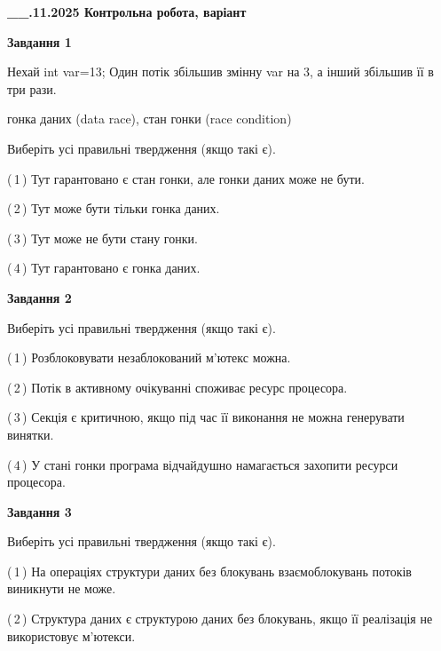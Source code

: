 \documentclass[12pt, ukrainian]{article}
\begin{document}
\begin {large}

\textbf{\_\_.11.2025 Контрольна робота, варіант  }\par


{

\begin{center}
\textbf{Завдання 1}
\end{center}
Нехай int var=13; Один потік збільшив змінну var на 3, а інший збільшив її в три рази.

гонка даних (data race), стан гонки (race condition)

Виберіть усі правильні твердження (якщо такі є).\par
\vspace{2mm}
(\,1\,) Тут гарантовано є стан гонки, але гонки даних може не бути.%

(\,2\,) Тут може бути тільки гонка даних.%

(\,3\,) Тут може не бути стану гонки.%

(\,4\,) Тут гарантовано є гонка даних.%



\begin{center}
\textbf{Завдання 2}
\end{center}
Виберіть усі правильні твердження (якщо такі є).\par
\vspace{2mm}

(\,1\,) Розблоковувати незаблокований м’ютекс можна.%

(\,2\,) Потік в активному очікуванні споживає ресурс процесора.%

(\,3\,) Секція є критичною, якщо під час її виконання не можна генерувати винятки.%

(\,4\,) У стані гонки програма відчайдушно намагається захопити ресурси процесора.%



\begin{center}
\textbf{Завдання 3}
\end{center}
Виберіть усі правильні твердження (якщо такі є).\par
\vspace{2mm}

(\,1\,) На операціях структури даних без блокувань взаємоблокувань потоків виникнути не може.%

(\,2\,) Структура даних є структурою даних без блокувань, якщо її реалізація не використовує м’ютекси.%

}
\end{large}
\end{document}
